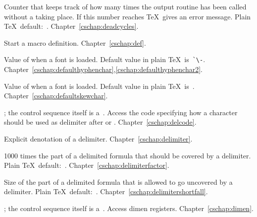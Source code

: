 \begin{glossinventory}
\item [\cs{deadcycles}]
      Counter that keeps track of how many times 
      the output routine has been called without a  
      taking place. 
      If this number reaches  \TeX\
      gives an error message. Plain \TeX\ default:~.
Chapter~\ref{cschap:deadcycles}.

\item [\cs{def}]
       Start a macro definition.
Chapter~\ref{cschap:def}.

\item [\cs{defaulthyphenchar}]
      Value of  when a font is loaded.
      Default value in plain \TeX\ is~\verb>`\->.
Chapter~\ref{cschap:defaulthyphenchar},\ref{cschap:defaulthyphenchar2}.

\item [\cs{defaultskewchar}]
      Value of  when a font is loaded.
      Default value in plain \TeX\ is~.
Chapter~\ref{cschap:defaultskewchar}.

\item [\cs{delcode\gr{8-bit number}}]
      ; the control sequence itself
      is a~.
      Access the
      code specifying how a character should be used as delimiter 
      after \cs{left} or \cs{right}.
Chapter~\ref{cschap:delcode}.

\item [\cs{delimiter\gr{27-bit number}}]
      Explicit denotation of a delimiter.
Chapter~\ref{cschap:delimiter}.

\item [\cs{delimiterfactor}]
      1000 times the part of a delimited formula that should be
      covered by a delimiter.
      Plain \TeX\ default:~.
Chapter~\ref{cschap:delimiterfactor}.

\item [\cs{delimitershortfall}]
      Size of the part of a delimited formula that is allowed 
      to go uncovered by a delimiter.
      Plain \TeX\ default:~\n{5pt}.
Chapter~\ref{cschap:delimitershortfall}.

\item [\cs{dimen\gr{8-bit number}}]
      ; the control sequence itself
      is a~.
      Access dimen registers.
Chapter~\ref{cschap:dimen}.


\end{glossinventory}

